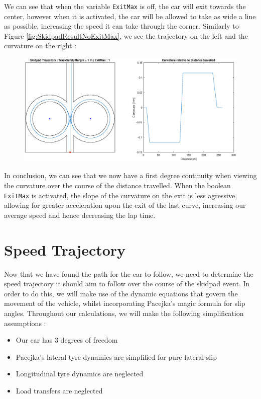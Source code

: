 \documentclass[a4paper, 11pt]{article}
\begin{document}
We can see that when the variable \texttt{ExitMax} is off, the car will exit towards the center, however when it is activated, the car will be allowed to take as wide a line as possible, increasing the speed it can take through the corner. Similarly to Figure \ref{fig:SkidpadResultNoExitMax}, we see the trajectory on the left and the curvature on the right :

\begin{figure}[H]
	\centering
	\includegraphics[trim = 4.5cm 0.5cm 3.1cm 0.6cm, clip, width = \textwidth]{Figures/SkidpadResultExitMax}
	\caption{ }
	\label{fig:SkidpadResultExitMax}
\end{figure}

In conclusion, we can see that we now have a first degree continuity when viewing the curvature over the course of the distance travelled. When the boolean \texttt{ExitMax} is activated, the slope of the curvature on the exit is less agressive, allowing for greater acceleration upon the exit of the last curve, increasing our average speed and hence decreasing the lap time.

\newpage
\section{Speed Trajectory}

Now that we have found the path for the car to follow, we need to determine the speed trajectory it should aim to follow over the course of the skidpad event. In order to do this, we will make use of the dynamic equations that govern the movement of the vehicle, whilst incorporating Pacejka's magic formula for slip angles. Throughout our calculations, we will make the following simplification assumptions :
\begin{itemize}
	\item Our car has 3 degrees of freedom
	\item Pacejka’s lateral tyre dynamics are simplified for pure lateral slip
	\item Longitudinal tyre dynamics are neglected
	\item Load transfers are neglected
\end{itemize}
\end{document}
